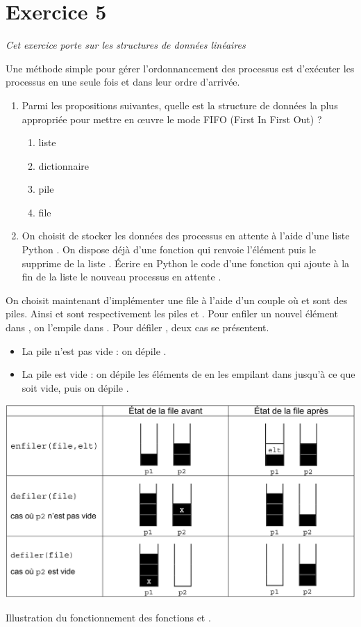 \documentclass[11pt,a4paper,french,twoside]{PMCours}
\begin{document}
\newpage
\section*{Exercice 5}
\emph{Cet exercice porte sur les structures de données linéaires}

\medskip
Une méthode simple pour gérer l'ordonnancement des processus est d'exécuter les processus
en une seule fois et dans leur ordre d'arrivée.
\begin{enumerate}
\item Parmi les propositions suivantes, quelle est la structure de données la plus appropriée pour
mettre en œuvre le mode FIFO (First In First Out) ?
\begin{enumerate}
\item liste
\item dictionnaire
\item pile
\item file
\end{enumerate}
\item On choisit de stocker les données des processus en attente à l'aide d'une liste Python .
On dispose déjà d'une fonction  qui renvoie l'élément  puis le
supprime de la liste . Écrire en Python le code d'une fonction  qui
ajoute à la fin de la liste  le nouveau processus en attente .
\end{enumerate}

On choisit maintenant d'implémenter une file  à l'aide d'un couple  où  et 
sont des piles. Ainsi  et  sont respectivement les piles  et .
Pour enfiler un nouvel élément  dans , on l'empile dans .
Pour défiler , deux cas se présentent.
\begin{itemize}
    \item La pile  n'est pas vide : on dépile .
    \item La pile  est vide : on dépile les éléments de  en les empilant dans  jusqu'à ce
    que  soit vide, puis on dépile .
\end{itemize}
\begin{center}
    \includegraphics[width=\textwidth]{BacBlanc2Sujet2_NSI2122-img1.png}
    
    Illustration du fonctionnement des fonctions  et .
\end{center}
\end{document}
